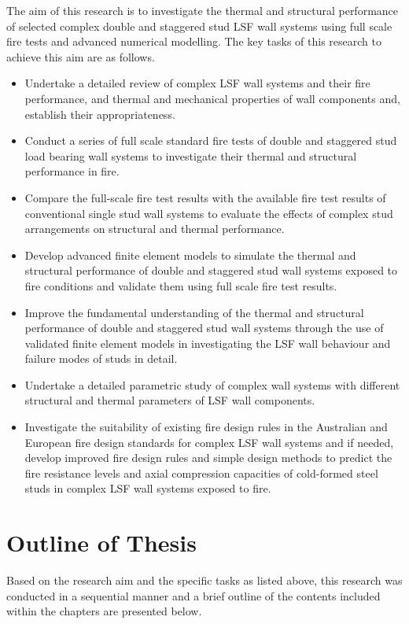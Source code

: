 The aim of this research is to investigate the thermal and structural performance of selected complex double and staggered stud LSF wall systems using full scale fire tests and advanced numerical modelling. The key tasks of this research to achieve this aim are as follows. 
\begin{itemize}
	\item Undertake a detailed review of complex LSF wall systems and their fire performance, and thermal and mechanical properties of wall components and, establish their appropriateness.
	\item Conduct a series of full scale standard fire tests of double and staggered stud load bearing wall systems to investigate their thermal and structural performance in fire. 
	\item Compare the full-scale fire test results with the available fire test results of conventional single stud wall systems to evaluate the effects of complex stud arrangements on structural and thermal performance.  
	\item Develop advanced finite element models to simulate the thermal and structural performance of double and staggered stud wall systems exposed to fire conditions and validate them using full scale fire test results.
	\item Improve the fundamental understanding of the thermal and structural performance of double and staggered stud wall systems through the use of validated finite element models in investigating the LSF wall behaviour and failure modes of studs in detail.
	\item Undertake a detailed parametric study of complex wall systems with different structural and thermal parameters of LSF wall components. 
	\item Investigate the suitability of existing fire design rules in the Australian and European fire design standards for complex LSF wall systems and if needed, develop improved fire design rules and simple design methods to predict the fire resistance levels and axial compression capacities of cold-formed steel studs in complex LSF wall systems exposed to fire.
\end{itemize}

\section{Outline of Thesis}

Based on the research aim and the specific tasks as listed above, this research was conducted in a sequential manner and a brief outline of the contents included within the chapters are presented below.

